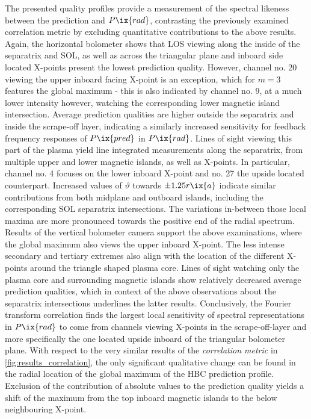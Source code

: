                 The presented quality profiles provide a measurement of the spectral likeness between the prediction and $P\ix{rad}$, contrasting the previously examined correlation metric by excluding quantitative contributions to the above results. Again, the horizontal bolometer shows that LOS viewing along the inside of the separatrix and SOL, as well as across the triangular plane and inboard side located X-points present the lowest prediction quality. However, channel no. 20 viewing the upper inboard facing X-point is an exception, which for $m=3$ features the global maximum - this is also indicated by channel no. 9, at a much lower intensity however, watching the corresponding lower magnetic island intersection. Average prediction qualities are higher outside the separatrix and inside the scrape-off layer, indicating a similarly increased sensitivity for feedback frequency responses of $P\ix{pred}$ in $P\ix{rad}$. Lines of sight viewing this part of the plasma yield line integrated measurements along the separatrix, from multiple upper and lower magnetic islands, as well as X-points. In particular, channel no. 4 focuses on the lower inboard X-point and no. 27 the upside located counterpart. Increased values of $\vartheta$ towards $\pm1.25r\ix{a}$ indicate similar contributions from both midplane and outboard islands, including the corresponding SOL separatrix intersections. The variations in-between those local maxima are more pronounced towards the positive end of the radial spectrum. Results of the vertical bolometer camera support the above examinations, where the global maximum also views the upper inboard X-point. The less intense secondary and tertiary extremes also align with the location of the different X-points around the triangle shaped plasma core. Lines of sight watching only the plasma core and surrounding magnetic islands show relatively decreased average prediction qualities, which in context of the above observations about the separatrix intersections underlines the latter results. Conclusively, the Fourier transform correlation finds the largest local sensitivity of spectral representations in $P\ix{rad}$ to come from channels viewing X-points in the scrape-off-layer and more specifically the one located upside inboard of the triangular bolometer plane. With respect to the very similar results of the \textit{correlation metric} in \cref{fig:results_correlation}, the only significant qualitative change can be found in the radial location of the global maximum of the HBC prediction profile. Exclusion of the contribution of absolute values to the prediction quality yields a shift of the maximum from the top inboard magnetic islands to the below neighbouring X-point.\\%
